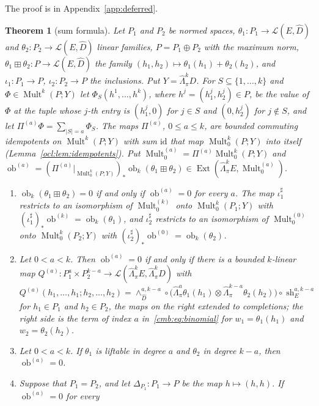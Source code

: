 \documentclass[11pt]{amsart}
\newtheorem{theorem}{Theorem}[section]
\theoremstyle{definition}
\theoremstyle{remark}
\numberwithin{equation}{section}
\newcommand{\cL}{\mathcal L}
\newcommand{\Mult}{\operatorname{Mult}}
\newcommand{\id}{\mathrm{id}}
\newcommand{\abs}[1]{\lvert #1\rvert}
\theoremstyle{plain}
\theoremstyle{definition}
\theoremstyle{plain}
\newcommand{\ob}{\operatorname{ob}}
\newcommand{\Ext}{\operatorname{Ext}}
\begin{document}
The proof is in Appendix~\ref{app:deferred}.

\begin{theorem}[sum formula]\label{cmb:thm:cartan}
Let $P_1$ and $P_2$ be normed spaces, $\theta_1\colon P_1\to\cL(E,\widehat D)$ and $\theta_2\colon P_2\to\cL(E,\widehat D)$
linear families, $P=P_1\oplus P_2$ with the maximum norm, $\theta_1\boxplus\theta_2\colon P\to\cL(E,\widehat D)$ the family
$(h_1,h_2)\mapsto\theta_1(h_1)+\theta_2(h_2)$, and $\iota_1\colon P_1\to P$, $\iota_2\colon P_2\to P$ the inclusions. Put
$Y=\widehat\Lambda^k_\pi D$. For $S\subseteq\{1,\dots,k\}$ and $\Phi\in\Mult^k(P;Y)$ let $\Phi_S(h^1,\dots,h^k)$, where
$h^j=(h^j_1,h^j_2)\in P$, be the value of $\Phi$ at the tuple whose $j$-th entry is $(h^j_1,0)$ for $j\in S$ and $(0,h^j_2)$
for $j\notin S$, and let $\Pi^{(a)}\Phi=\sum_{\abs S=a}\Phi_S$. The maps $\Pi^{(a)}$, $0\le a\le k$, are bounded commuting
idempotents on $\Mult^k(P;Y)$ with sum $\id$ that map $\Mult^k_0(P;Y)$ into itself (Lemma~\ref{ocl:lem:idempotents}). Put
$\Mult^{(a)}_0=\Pi^{(a)}\Mult^k_0(P;Y)$ and
$\ob^{(a)}=(\Pi^{(a)}|_{\Mult^k_0(P;Y)})_*\ob_k(\theta_1\boxplus\theta_2)\in\Ext(\widehat\Lambda^k_\pi E,\Mult^{(a)}_0)$.
\begin{enumerate}
\item $\ob_k(\theta_1\boxplus\theta_2)=0$ if and only if $\ob^{(a)}=0$ for every $a$. The map $\iota_1^\sharp$ restricts to an
isomorphism of $\Mult^{(k)}_0$ onto $\Mult^k_0(P_1;Y)$ with $(\iota_1^\sharp)_*\ob^{(k)}=\ob_k(\theta_1)$, and $\iota_2^\sharp$
restricts to an isomorphism of $\Mult^{(0)}_0$ onto $\Mult^k_0(P_2;Y)$ with $(\iota_2^\sharp)_*\ob^{(0)}=\ob_k(\theta_2)$.
\item Let $0<a<k$. Then $\ob^{(a)}=0$ if and only if there is a bounded $k$-linear map
$Q^{(a)}\colon P_1^a\times P_2^{k-a}\to\cL(\widehat\Lambda^k_\pi E,\widehat\Lambda^k_\pi D)$ with
\[
 Q^{(a)}(h_1,\dots,h_1;h_2,\dots,h_2)=\wedge^{a,k-a}_{\widehat D}\circ\bigl(\widehat\Lambda^a_\pi\theta_1(h_1)\otimes
 \widehat\Lambda^{k-a}_\pi\theta_2(h_2)\bigr)\circ\operatorname{sh}^{a,k-a}_E
\]
for $h_1\in P_1$ and $h_2\in P_2$, the maps on the right extended to completions; the right side is the term of index $a$
in~\eqref{cmb:eq:binomial} for $w_1=\theta_1(h_1)$ and $w_2=\theta_2(h_2)$.
\item Let $0<a<k$. If $\theta_1$ is liftable in degree $a$ and $\theta_2$ in degree $k-a$, then $\ob^{(a)}=0$.
\item Suppose that $P_1=P_2$, and let $\Delta_{P_1}\colon P_1\to P$ be the map $h\mapsto(h,h)$. If $\ob^{(a)}=0$ for every

\end{enumerate}
\end{theorem}
\end{document}
